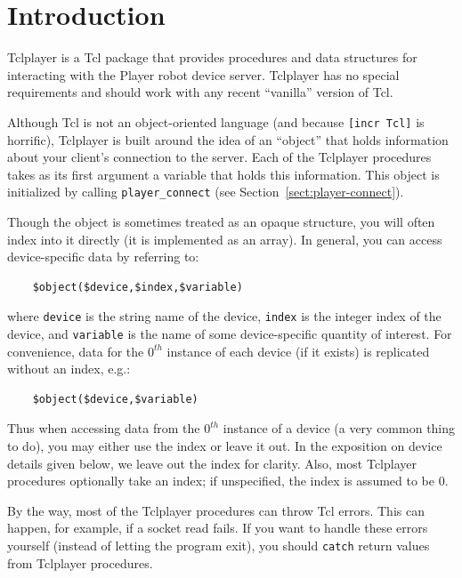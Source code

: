 \documentclass[11pt]{article}
\begin{document}
\setcounter{page}{0}
\section{Introduction}
Tclplayer is a Tcl package that provides procedures and data structures for
interacting with the Player robot device server.  Tclplayer has no special
requirements and should work with any recent ``vanilla'' version of Tcl.

Although Tcl is not an object-oriented language (and because {\tt [incr
Tcl]} is horrific), Tclplayer is built around the idea of an ``object'' that
holds information about your client's connection to the server.  Each of the
Tclplayer procedures takes as its first argument a variable that holds this
information.  This object is initialized by calling {\tt player\_connect}
(see Section~\ref{sect:player-connect}).  

Though the object is sometimes treated as an opaque structure, you will
often index into it directly (it is implemented as an array).  In general, you
can access device-specific data by referring to:
\begin{verbatim}
    $object($device,$index,$variable)
\end{verbatim}
where {\tt device} is the string name of the device, {\tt index} is the integer
index of the device, and {\tt variable} is the name of some device-specific
quantity of interest.  For convenience, data for the $0^{th}$ instance of 
each device (if it exists) is replicated without an index, e.g.:
\begin{verbatim}
    $object($device,$variable)
\end{verbatim}
Thus when accessing data from the $0^{th}$ instance of a device (a very
common thing to do), you may either use the index or leave it out.  In the
exposition on device details given below, we leave out the index for clarity.
Also, most Tclplayer procedures optionally take an index; if unspecified, the
index is assumed to be 0.

By the way, most of the Tclplayer procedures can throw Tcl errors.  This can
happen, for example, if a socket read fails.  If you want to handle these
errors yourself (instead of letting the program exit), you should {\tt catch} 
return values from Tclplayer procedures.
\end{document}
